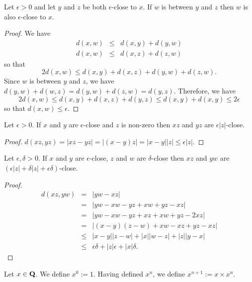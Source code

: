 \begin{lem}\label{c3s3l16}
Let $\epsilon > 0$ and let $y$ and $z$ be both $\epsilon$-close to $x$.
If $w$ is between $y$ and $z$ then $w$ is also $\epsilon$-close to $x$.
\end{lem}
\begin{proof}
We have
\begin{eqnarray*}
d(x, w) &\le& d(x, y) + d(y, w) \\
d(x, w) &\le& d(x, z) + d(z, w) 
\end{eqnarray*}
so that 
\[
2d(x, w) \le d(x, y) + d(x, z) + d(y, w) + d(z, w).
\]
Since $w$ is between $y$ and $z$, we have $ d(y, w) + d(w, z) = d(y, w) +
d(z, w) = d(y, z)$. Therefore, we have
\[
2d(x, w) \le d(x, y) + d(x, z) + d(y, z) \le d(x, y) + d(x, y) \le
2\epsilon 
\]
so that $d(x, w) \le \epsilon$.
\end{proof}

\begin{lem}\label{c3s3l17}
Let $\epsilon > 0$. If $x$ and $y$ are $\epsilon$-close and $z$ is non-zero
then $xz$ and $yz$ are $\epsilon|z|$-close.
\end{lem}
\begin{proof}
$d(xz, yz) = |xz - yz| = |(x - y)z| = |x - y||z| \le \epsilon|z|$.
\end{proof}

\begin{lem}\label{c3s3l18}
Let $\epsilon, \delta > 0$. If $x$ and $y$ are $\epsilon$-close, $z$ and
$w$ are $\delta$-close then $xz$ and $yw$ are $(\epsilon|z| + \delta|z| +
\epsilon\delta)$-close.
\end{lem}
\begin{proof}
\begin{eqnarray*}
d(xz, yw) &=& |yw - xz| \\
 &=& |yw - xw - yz + xw + yz - xz| \\
 &=& |yw - xw - yz + xz + xw + yz -2xz| \\
 &=& |(x - y)(z - w) + xw - xz + yz - xz| \\
 &\le& |x - y||z - w| + |x||w - z| + |z||y - x| \\
 &\le& \epsilon\delta + |z|\epsilon + |x|\delta.
\end{eqnarray*}
\end{proof}

\begin{defn}\label{c3s3d4}
Let $x \in \mathbf{Q}$. We define $x^0 := 1$. Having defined $x^n$, we define
$x^{n+1} := x \times x^n$.
\end{defn}

